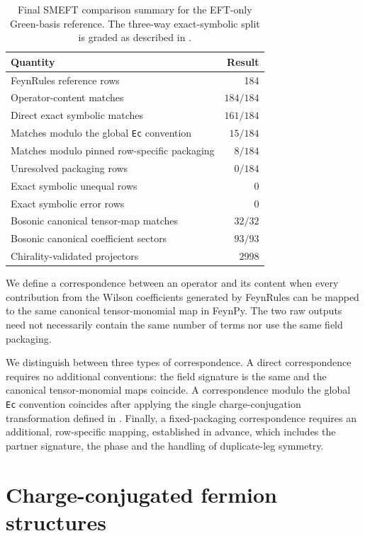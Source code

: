 \begin{table}[htbp]
\centering
\begin{tabular}{lr}
\toprule
Quantity & Result \\
\midrule
FeynRules reference rows & 184 \\
Operator-content matches & $184/184$ \\
\midrule
Direct exact symbolic matches & $161/184$ \\
Matches modulo the global \texttt{Ec} convention & $15/184$ \\
Matches modulo pinned row-specific packaging & $8/184$ \\
Unresolved packaging rows & $0/184$ \\
\midrule
Exact symbolic unequal rows & $0$ \\
Exact symbolic error rows & $0$ \\
Bosonic canonical tensor-map matches & $32/32$ \\
Bosonic canonical coefficient sectors & $93/93$ \\
Chirality-validated projectors & $2998$ \\
\bottomrule
\end{tabular}
\caption{Final SMEFT comparison summary for the EFT-only Green-basis
reference. The three-way exact-symbolic split is graded as described in
.}
\label{tab:smeft-final-comparison}
\end{table}

We define a correspondence between an operator and its content when every contribution from the Wilson coefficients generated by FeynRules can be mapped to the same canonical tensor-monomial map in FeynPy. The two raw outputs need not necessarily contain the same number of terms nor use the same field packaging.

We distinguish between three types of correspondence. A direct correspondence requires no additional conventions: the field signature is the same and the canonical tensor-monomial maps coincide. A correspondence modulo the global \texttt{Ec} convention coincides after applying the single charge-conjugation transformation defined in . Finally, a fixed-packaging correspondence requires an additional, row-specific mapping, established in advance, which includes the partner signature, the phase and the handling of duplicate-leg symmetry.



\section{Charge-conjugated fermion structures}
\label{sec:validation-ec}

